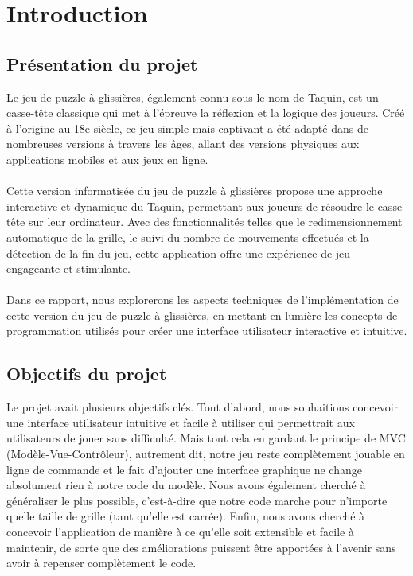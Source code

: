 \documentclass[a4paper,10pt]{article}
\title{\projet}
\author{\contributeurs \\ \contributeurss \\ \\ Responsable de TP : \chargeTP}
\date{\today}
\begin{document}
\maketitle
\thispagestyle{mylogo} 

\newpage
\tableofcontents
\clearpage

\section{Introduction}

\subsection{Présentation du projet}
Le jeu de puzzle à glissières, également connu sous le nom de Taquin, est un casse-tête
classique qui met à l'épreuve la réflexion et la logique des joueurs. Créé à l'origine au 18e
siècle, ce jeu simple mais captivant a été adapté dans de nombreuses versions à travers les
âges, allant des versions physiques aux applications mobiles et aux jeux en ligne.\\ \\
Cette version informatisée du jeu de puzzle à glissières propose une approche interactive et
dynamique du Taquin, permettant aux joueurs de résoudre le casse-tête sur leur ordinateur.
Avec des fonctionnalités telles que le redimensionnement automatique de la grille,
le suivi du nombre de mouvements effectués et la détection de la fin du jeu,
cette application offre une expérience de jeu engageante et stimulante.\\ \\
Dans ce rapport, nous explorerons les aspects techniques de l'implémentation de cette version du
jeu de puzzle à glissières,
en mettant en lumière les concepts de programmation utilisés pour créer une interface
utilisateur interactive et intuitive.

\subsection{Objectifs du projet}
Le projet avait plusieurs objectifs clés. Tout d'abord, nous souhaitions concevoir une interface utilisateur intuitive et facile à utiliser qui permettrait aux utilisateurs de jouer sans difficulté. Mais tout cela en gardant le principe de MVC (Modèle-Vue-Contrôleur), autrement dit, notre jeu reste complètement jouable en ligne de commande et le fait d'ajouter une interface graphique ne change absolument rien à notre code du modèle. Nous avons également cherché à généraliser le plus possible, c'est-à-dire que notre code marche pour n'importe quelle taille de grille (tant qu'elle est carrée). Enfin, nous avons cherché à concevoir l'application de manière à ce qu'elle soit extensible et facile à maintenir, de sorte que des améliorations puissent être apportées à l'avenir sans avoir à repenser complètement le code.
\end{document}
